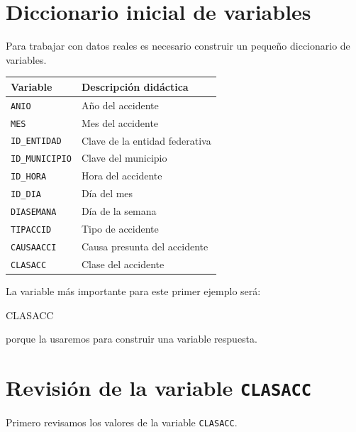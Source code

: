 \documentclass[
  11pt,
  letterpaper,
]{book}
\newenvironment{Shaded}{\begin{snugshade}}{\end{snugshade}}
\newcommand{\AttributeTok}[1]{\textcolor[rgb]{0.40,0.45,0.13}{#1}}
\newcommand{\ControlFlowTok}[1]{\textcolor[rgb]{0.00,0.23,0.31}{\textbf{#1}}}
\newcommand{\FunctionTok}[1]{\textcolor[rgb]{0.28,0.35,0.67}{#1}}
\newcommand{\NormalTok}[1]{\textcolor[rgb]{0.00,0.23,0.31}{#1}}
\newcommand{\SpecialCharTok}[1]{\textcolor[rgb]{0.37,0.37,0.37}{#1}}
\newcommand{\StringTok}[1]{\textcolor[rgb]{0.13,0.47,0.30}{#1}}
\newcounter{none} %
\begin{document}
\section{Diccionario inicial de
variables}\label{diccionario-inicial-de-variables}

Para trabajar con datos reales es necesario construir un pequeño
diccionario de variables.

{\def\LTcaptype{none} %
\begin{longtable}[]{@{}ll@{}}
\toprule\noalign{}
Variable & Descripción didáctica \\
\midrule\noalign{}
\endhead
\bottomrule\noalign{}
\endlastfoot
\texttt{ANIO} & Año del accidente \\
\texttt{MES} & Mes del accidente \\
\texttt{ID\_ENTIDAD} & Clave de la entidad federativa \\
\texttt{ID\_MUNICIPIO} & Clave del municipio \\
\texttt{ID\_HORA} & Hora del accidente \\
\texttt{ID\_DIA} & Día del mes \\
\texttt{DIASEMANA} & Día de la semana \\
\texttt{TIPACCID} & Tipo de accidente \\
\texttt{CAUSAACCI} & Causa presunta del accidente \\
\texttt{CLASACC} & Clase del accidente \\
\end{longtable}
}

La variable más importante para este primer ejemplo será:

\begin{Shaded}
\begin{Highlighting}[]
\NormalTok{CLASACC}
\end{Highlighting}
\end{Shaded}

porque la usaremos para construir una variable respuesta.

\section{\texorpdfstring{Revisión de la variable
\texttt{CLASACC}}{Revisión de la variable CLASACC}}\label{revisiuxf3n-de-la-variable-clasacc}

Primero revisamos los valores de la variable \texttt{CLASACC}.

\begin{Shaded}
\end{Shaded}
\end{document}
